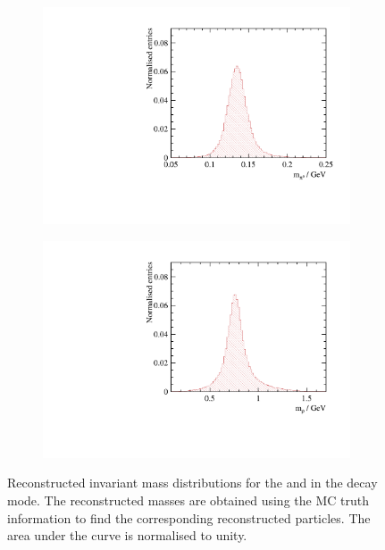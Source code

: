 \begin{figure}[htbp]
\centering
\begin{subfigure}[b]{0.45\textwidth}
 \includegraphics[width=\textwidth]{tau/var3/mPionRhoFit_100GeV_improved_zoom.pdf}
  \caption{}
  \label{fig:tauPionFromRho}
\end{subfigure}
\begin{subfigure}[b]{0.45\textwidth}
 \includegraphics[width=\textwidth]{tau/var3/mRhoRhoFit_100GeV_improved_zoom.pdf}
  \caption{}
  \label{fig:tauRhoFromRho}
\end{subfigure}
\caption
{Reconstructed invariant mass distributions for the \Ppizero and \Prho in the \decayRhoShort decay mode. The reconstructed masses are obtained using the MC truth information to find the corresponding reconstructed particles. The area under the curve is normalised to unity.}
\label{fig:tauRho}
\end{figure}



